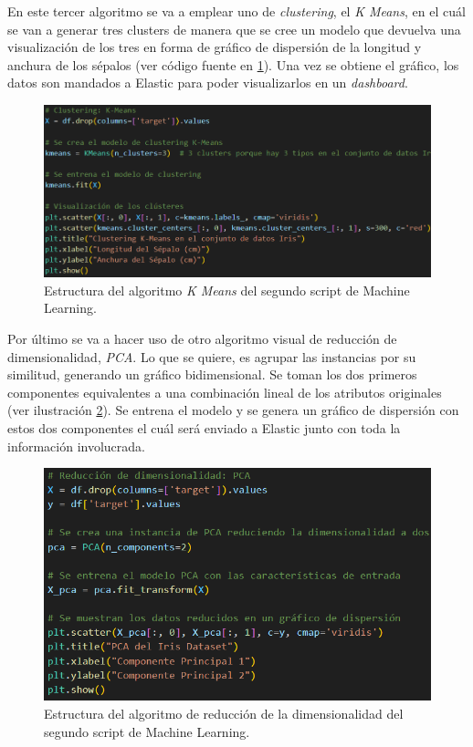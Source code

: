 En este tercer algoritmo se va a emplear uno de \textit{clustering}, el \textit{K Means}, en el cuál se van a generar tres clusters de manera que se cree un modelo que devuelva una visualización de los tres en forma de gráfico de dispersión de la longitud y anchura de los sépalos (ver código fuente en  \ref{fig:cluster1}). Una vez se obtiene el gráfico, los datos son mandados a Elastic para poder visualizarlos en un \textit{dashboard}.
\begin{figure}
    \centering
    \includegraphics[width=1\linewidth]{img/iris10.png}
    \caption{Estructura del algoritmo \textit{K Means} del segundo script de Machine Learning.}
    \label{fig:cluster1}
\end{figure}


Por último se va a hacer uso de otro algoritmo visual de reducción de dimensionalidad, \textit{PCA}. Lo que se quiere, es agrupar las instancias por su similitud, generando un gráfico bidimensional. Se toman los dos primeros componentes equivalentes a una combinación lineal de los atributos originales  (ver ilustración  \ref{fig:pca1}). Se entrena el modelo y se genera un gráfico de dispersión con estos dos componentes el cuál será enviado a Elastic junto con toda la información involucrada. 
\begin{figure}
    \centering
    \includegraphics[width=1\linewidth]{img/iris11.png}
    \caption{Estructura del algoritmo de reducción de la dimensionalidad del segundo script de Machine Learning.}
    \label{fig:pca1}
\end{figure}

